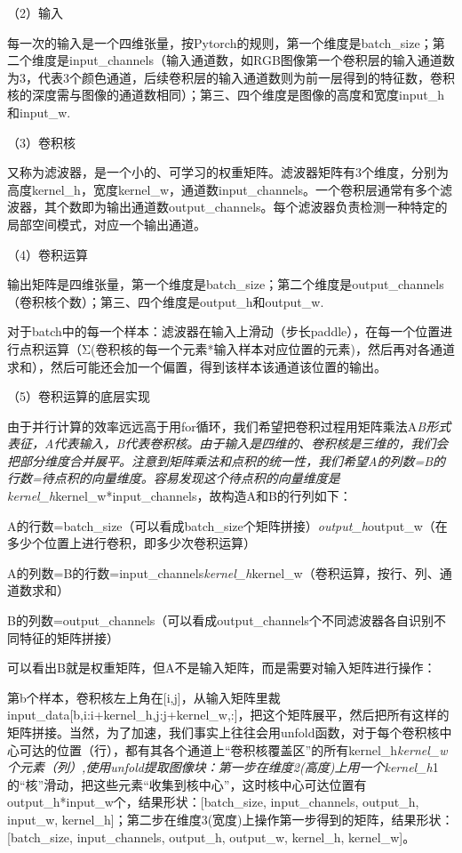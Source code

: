 （2）输入

每一次的输入是一个四维张量，按Pytorch的规则，第一个维度是batch\_size；第二个维度是input\_channels（输入通道数，如RGB图像第一个卷积层的输入通道数为3，代表3个颜色通道，后续卷积层的输入通道数则为前一层得到的特征数，卷积核的深度需与图像的通道数相同）；第三、四个维度是图像的高度和宽度input\_h和input\_w.

（3）卷积核

又称为滤波器，是一个小的、可学习的权重矩阵。滤波器矩阵有3个维度，分别为高度kernel\_h，宽度kernel\_w，通道数input\_channels。一个卷积层通常有多个滤波器，其个数即为输出通道数output\_channels。每个滤波器负责检测一种特定的局部空间模式，对应一个输出通道。

（4）卷积运算

输出矩阵是四维张量，第一个维度是batch\_size；第二个维度是output\_channels（卷积核个数）；第三、四个维度是output\_h和output\_w.

对于batch中的每一个样本：滤波器在输入上滑动（步长paddle），在每一个位置进行点积运算（Σ(卷积核的每一个元素*输入样本对应位置的元素)，然后再对各通道求和），然后可能还会加一个偏置，得到该样本该通道该位置的输出。

（5）卷积运算的底层实现

由于并行计算的效率远远高于用for循环，我们希望把卷积过程用矩阵乘法A\emph{B形式表征，A代表输入，B代表卷积核。由于输入是四维的、卷积核是三维的，我们会把部分维度合并展平。注意到矩阵乘法和点积的统一性，我们希望A的列数=B的行数=待点积的向量维度。容易发现这个待点积的向量维度是kernel\_h}kernel\_w*input\_channels，故构造A和B的行列如下：

A的行数=batch\_size（可以看成batch\_size个矩阵拼接）\emph{output\_h}output\_w（在多少个位置上进行卷积，即多少次卷积运算）

A的列数=B的行数=input\_channels\emph{kernel\_h}kernel\_w（卷积运算，按行、列、通道数求和）

B的列数=output\_channels（可以看成output\_channels个不同滤波器各自识别不同特征的矩阵拼接）

可以看出B就是权重矩阵，但A不是输入矩阵，而是需要对输入矩阵进行操作：

第b个样本，卷积核左上角在{[}i,j{]}，从输入矩阵里裁input\_data{[}b,i:i+kernel\_h,j:j+kernel\_w,:{]}，把这个矩阵展平，然后把所有这样的矩阵拼接。当然，为了加速，我们事实上往往会用unfold函数，对于每个卷积核中心可达的位置（行），都有其各个通道上``卷积核覆盖区''的所有kernel\_h\emph{kernel\_w个元素（列）,使用unfold提取图像块：第一步在维度2(高度)上用一个kernel\_h}1的``核''滑动，把这些元素``收集到核中心''，这时核中心可达位置有output\_h*input\_w个，结果形状：{[}batch\_size, input\_channels, output\_h, input\_w, kernel\_h{]}；第二步在维度3(宽度)上操作第一步得到的矩阵，结果形状：{[}batch\_size, input\_channels, output\_h, output\_w, kernel\_h, kernel\_w{]}。

